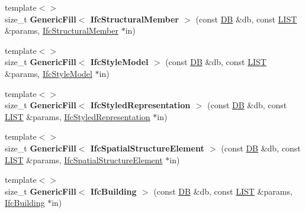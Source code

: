 \begin{DoxyCompactItemize}
\item 
\hypertarget{namespace_assimp_1_1_s_t_e_p_ac14072bd902840cad40935af3f3ce719}{{\footnotesize template$<$$>$ }\\size\+\_\+t {\bfseries Generic\+Fill$<$ Ifc\+Structural\+Member $>$} (const \hyperlink{class_assimp_1_1_s_t_e_p_1_1_d_b}{D\+B} \&db, const \hyperlink{class_assimp_1_1_s_t_e_p_1_1_e_x_p_r_e_s_s_1_1_l_i_s_t}{L\+I\+S\+T} \&params, \hyperlink{struct_assimp_1_1_i_f_c_1_1_ifc_structural_member}{Ifc\+Structural\+Member} $\ast$in)}\label{namespace_assimp_1_1_s_t_e_p_ac14072bd902840cad40935af3f3ce719}

\item 
\hypertarget{namespace_assimp_1_1_s_t_e_p_a32186f15acbd3655581ff7baa0ca69e9}{{\footnotesize template$<$$>$ }\\size\+\_\+t {\bfseries Generic\+Fill$<$ Ifc\+Style\+Model $>$} (const \hyperlink{class_assimp_1_1_s_t_e_p_1_1_d_b}{D\+B} \&db, const \hyperlink{class_assimp_1_1_s_t_e_p_1_1_e_x_p_r_e_s_s_1_1_l_i_s_t}{L\+I\+S\+T} \&params, \hyperlink{struct_assimp_1_1_i_f_c_1_1_ifc_style_model}{Ifc\+Style\+Model} $\ast$in)}\label{namespace_assimp_1_1_s_t_e_p_a32186f15acbd3655581ff7baa0ca69e9}

\item 
\hypertarget{namespace_assimp_1_1_s_t_e_p_afc3d9c61ed73656228cd68c9a33308e7}{{\footnotesize template$<$$>$ }\\size\+\_\+t {\bfseries Generic\+Fill$<$ Ifc\+Styled\+Representation $>$} (const \hyperlink{class_assimp_1_1_s_t_e_p_1_1_d_b}{D\+B} \&db, const \hyperlink{class_assimp_1_1_s_t_e_p_1_1_e_x_p_r_e_s_s_1_1_l_i_s_t}{L\+I\+S\+T} \&params, \hyperlink{struct_assimp_1_1_i_f_c_1_1_ifc_styled_representation}{Ifc\+Styled\+Representation} $\ast$in)}\label{namespace_assimp_1_1_s_t_e_p_afc3d9c61ed73656228cd68c9a33308e7}

\item 
\hypertarget{namespace_assimp_1_1_s_t_e_p_aa11c4b396903b4496fa17a6a41604cc6}{{\footnotesize template$<$$>$ }\\size\+\_\+t {\bfseries Generic\+Fill$<$ Ifc\+Spatial\+Structure\+Element $>$} (const \hyperlink{class_assimp_1_1_s_t_e_p_1_1_d_b}{D\+B} \&db, const \hyperlink{class_assimp_1_1_s_t_e_p_1_1_e_x_p_r_e_s_s_1_1_l_i_s_t}{L\+I\+S\+T} \&params, \hyperlink{struct_assimp_1_1_i_f_c_1_1_ifc_spatial_structure_element}{Ifc\+Spatial\+Structure\+Element} $\ast$in)}\label{namespace_assimp_1_1_s_t_e_p_aa11c4b396903b4496fa17a6a41604cc6}

\item 
\hypertarget{namespace_assimp_1_1_s_t_e_p_ad0803ae8847112aef93a715862bcd262}{{\footnotesize template$<$$>$ }\\size\+\_\+t {\bfseries Generic\+Fill$<$ Ifc\+Building $>$} (const \hyperlink{class_assimp_1_1_s_t_e_p_1_1_d_b}{D\+B} \&db, const \hyperlink{class_assimp_1_1_s_t_e_p_1_1_e_x_p_r_e_s_s_1_1_l_i_s_t}{L\+I\+S\+T} \&params, \hyperlink{struct_assimp_1_1_i_f_c_1_1_ifc_building}{Ifc\+Building} $\ast$in)}\label{namespace_assimp_1_1_s_t_e_p_ad0803ae8847112aef93a715862bcd262}


\end{DoxyCompactItemize}

